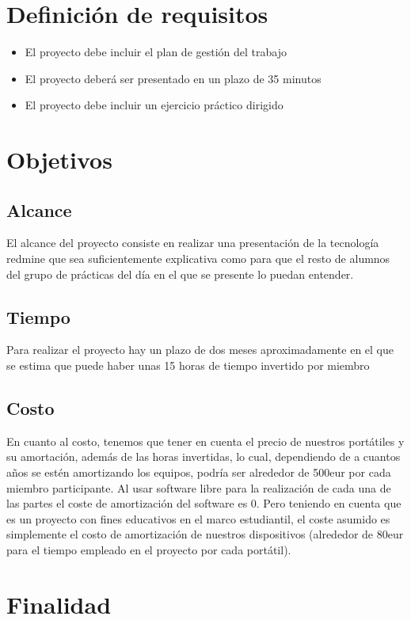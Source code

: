 \documentclass[a4paper,10pt]{scrartcl}
\begin{document}
\section{Definición de requisitos}
	\begin{itemize}
			\item El proyecto debe incluir el plan de gestión del trabajo
			\item El proyecto deberá ser presentado en un plazo de 35 minutos
			\item El proyecto debe incluir un ejercicio práctico dirigido
	\end{itemize}

\section{Objetivos}
\subsection{Alcance}
		El alcance del proyecto consiste en realizar una presentación de la tecnología redmine que sea suficientemente explicativa como para que el resto de alumnos del grupo de prácticas del día en el que se presente lo puedan entender.

\subsection{Tiempo}		
		Para realizar el proyecto hay un plazo de dos meses aproximadamente en el que se estima que puede haber unas 15 horas de tiempo invertido por miembro		
		
\subsection{Costo}
		En cuanto al costo, tenemos que tener en cuenta el precio de nuestros portátiles y su amortación, además de las horas invertidas, lo cual, dependiendo de a cuantos años se estén amortizando los equipos, podría ser alrededor de 500eur  por cada miembro participante.
		Al usar software libre para la realización de cada una de las partes el coste de amortización del software es 0.
		Pero teniendo en cuenta que es un proyecto con fines educativos en el marco estudiantil, el coste asumido es simplemente el costo de amortización de nuestros dispositivos (alrededor de 80eur para el tiempo empleado en el proyecto por cada portátil).


\section{Finalidad}
\end{document}
